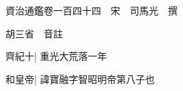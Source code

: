 






























































資治通鑑卷一百四十四　宋　司馬光　撰

胡三省　音註

齊紀十|{
	重光大荒落一年}


和皇帝|{
	諱寶融字智昭明帝第八子也}


